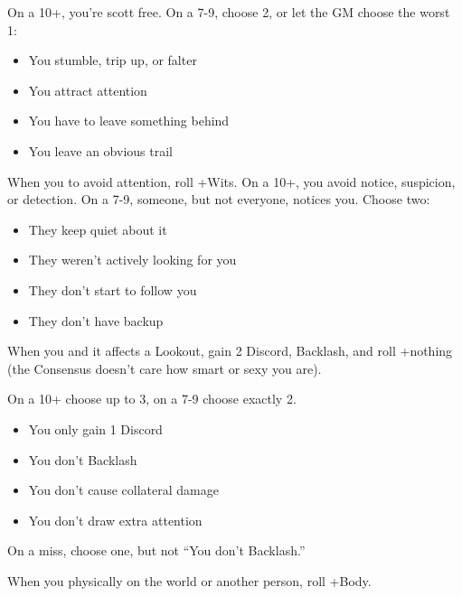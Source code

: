 \begin{multicols}{3}
\begin{move}
    On a 10+, you're scott free. On a 7-9, choose 2, or let the GM
    choose the worst 1:
    \begin{itemize}
      \setlength\itemsep{0em}
    \item You stumble, trip up, or falter
    \item You attract attention
    \item You have to leave something behind
    \item You leave an obvious trail
    \end{itemize}
  \end{move}

  \SEPARATOR

  \begin{move}
    When you  to avoid attention, roll
    +Wits. On a 10+, you avoid notice, suspicion, or detection. On a
    7-9, someone, but not everyone, notices you. Choose two:
    \begin{itemize}
      \setlength\itemsep{0em}
    \item They keep quiet about it
    \item They weren't actively looking for you
    \item They don't start to follow you
    \item They don't have backup
    \end{itemize}
  \end{move}

  \SEPARATOR

  \begin{move}
    When you  and it affects a Lookout, gain
    2 Discord, Backlash, and roll +nothing (the Consensus doesn't care
    how smart or sexy you are).

    On a 10+ choose up to 3, on a 7-9 choose exactly 2.
    \begin{itemize}
      \setlength\itemsep{0em}
    \item You only gain 1 Discord
    \item You don't Backlash
    \item You don't cause collateral damage
    \item You don't draw extra attention
    \end{itemize}
    On a miss, choose one, but not ``You don't Backlash.''
  \end{move}

  \columnbreak
  
  \begin{move}
    When you  physically on the world or another
    person, roll +Body.


\end{move}
\end{multicols}
